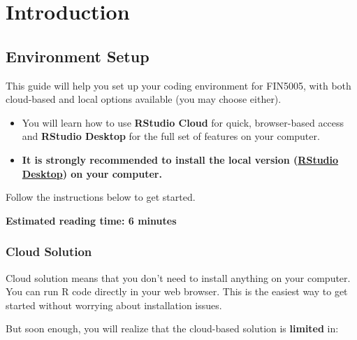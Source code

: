\documentclass[
  12pt,
  letterpaper,
]{scrbook}
\theoremstyle{plain}
\theoremstyle{definition}
\theoremstyle{remark}
\begin{document}
\part{Introduction}

\chapter{Environment Setup}\label{environment-setup}

\begin{tcolorbox}[enhanced jigsaw, bottomrule=.15mm, colframe=quarto-callout-note-color-frame, arc=.35mm, leftrule=.75mm, toprule=.15mm, breakable, rightrule=.15mm, opacityback=0, colback=white, left=2mm]

This guide will help you set up your coding environment for FIN5005,
with both cloud-based and local options available (you may choose
either).

\begin{itemize}
\item
  You will learn how to use \textbf{RStudio Cloud} for quick,
  browser-based access and \textbf{RStudio Desktop} for the full set of
  features on your computer.
\item
  \textbf{It is strongly recommended to install the local version
  (\hyperref[RStudio-Desktop]{RStudio Desktop}) on your computer.}
\end{itemize}

Follow the instructions below to get started.

\textbf{Estimated reading time: 6 minutes}

\end{tcolorbox}

\section{Cloud Solution}\label{cloud-solution}

Cloud solution means that you don't need to install anything on your
computer. You can run R code directly in your web browser. This is the
easiest way to get started without worrying about installation issues.

But soon enough, you will realize that the cloud-based solution is
\textbf{limited} in:
\end{document}

